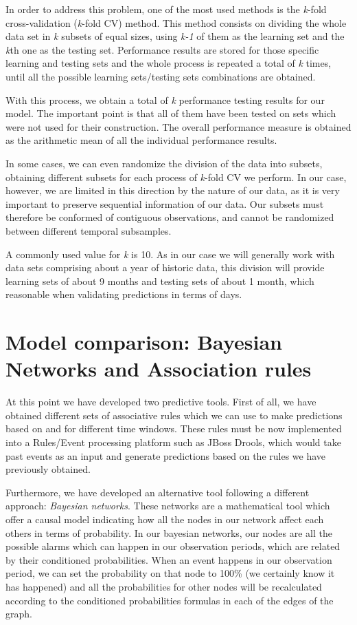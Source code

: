 \documentclass[a4paper,12pt]{article}
\begin{document}
In order to address this problem, one of the most used methods is the \textit{k}-fold cross-validation (\textit{k}-fold CV) method. This method consists on dividing the whole data set in \textit{k} subsets of equal sizes, using \textit{k-1} of them as the learning set and the \textit{k}th one as the testing set. Performance results are stored for those specific learning and testing sets and the whole process is repeated a total of \textit{k} times, until all the possible learning sets/testing sets combinations are obtained.

With this process, we obtain a total of \textit{k} performance testing results for our model. The important point is that all of them have been tested on sets which were not used for their construction. The overall performance measure is obtained as the arithmetic mean of all the individual performance results.

In some cases, we can even randomize the division of the data into subsets, obtaining different subsets for each process of \textit{k}-fold CV we perform. In our case, however, we are limited in this direction by the nature of our data, as it is very important to preserve sequential information of our data. Our subsets must therefore be conformed of contiguous observations, and cannot be randomized between different temporal subsamples.

A commonly used value for \textit{k} is 10. As in our case we will generally work with data sets comprising about a year of historic data, this division will provide learning sets of about 9 months and testing sets of about 1 month, which reasonable when validating predictions in terms of days.


\section{Model comparison: Bayesian Networks and Association rules}

At this point we have developed two predictive tools. First of all, we have obtained different sets of associative rules which we can use to make predictions based on and for different time windows. These rules must be now implemented into a Rules/Event processing platform such as JBoss Drools, which would take past events as an input and generate predictions based on the rules we have previously obtained.

Furthermore, we have developed an alternative tool following a different approach: \emph{Bayesian networks}. These networks are a mathematical tool which offer a causal model indicating how all the nodes in our network affect each others in terms of probability. In our bayesian networks, our nodes are all the possible alarms which can happen in our observation periods, which are related by their conditioned probabilities. When an event happens in our observation period, we can set the probability on that node to 100\% (we certainly know it has happened) and all the probabilities for other nodes will be recalculated according to the conditioned probabilities formulas in each of the edges of the graph.
\end{document}

